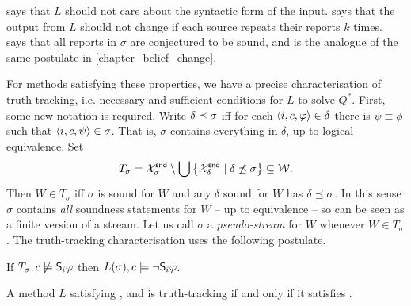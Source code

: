 \equivalence{} says that $L$ should not care about the syntactic form of the
input. \repetition{} says that the output from $L$ should not change if each
source repeats their reports $k$ times. \soundness{} says that all reports in
$\sigma$ are conjectured to be sound, and is the analogue of the same postulate
in \cref{chapter_belief_change}.

For methods satisfying these properties, we have a precise characterisation of
truth-tracking, i.e. necessary and sufficient conditions for $L$ to solve
$Q^*$. First, some new notation is required. Write $\delta \seqss \sigma$ iff
for each $\tuple{i, c, \phi} \in \delta$ there is $\psi \equiv \phi$ such that
$\tuple{i, c, \psi} \in \sigma$. That is, $\sigma$ contains everything in
$\delta$, up to logical equivalence. Set
\[
    T_\sigma
    = \Xsnd_\sigma
        \setminus
        \bigcup\left\{
            \Xsnd_\delta
            \mid
            \delta \not\seqss \sigma\right
        \}
    \subseteq \worlds.
\]
Then $W \in T_\sigma$ iff $\sigma$ is sound for $W$ and any $\delta$ sound for
$W$ has $\delta \seqss \sigma$. In this sense $\sigma$ contains \emph{all}
soundness statements for $W$ -- up to equivalence -- so can be seen as a finite
version of a stream. Let us call $\sigma$ a \emph{pseudo-stream} for $W$
whenever $W \in T_\sigma$.
%
The truth-tracking characterisation uses the following postulate.

\begin{axiom}[\credulity{}]
    If $T_\sigma, c \not\models \S_i\phi$
    then
    $L(\sigma), c \models \neg\S_i\phi$.
\end{axiom}

\begin{theorem}
    \label{tt_thm_tt_characterisation}
    A method $L$ satisfying \equivalence{}, \repetition{} and \soundness{} is
    truth-tracking if and only if it satisfies \credulity{}.

\end{theorem}

